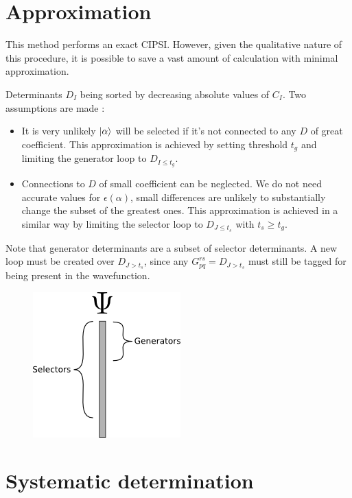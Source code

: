 \documentclass[./thesis.tex]{subfiles}
\begin{document}
\section{Approximation}

This method performs an exact CIPSI. However, given the qualitative nature of this procedure, it is possible to save a vast amount of calculation with minimal approximation.

Determinants $D_I$ being sorted by decreasing absolute values of $C_I$. Two assumptions are made :
\begin{itemize}
\item
It is very unlikely $\ket \alpha$ will be selected if it's not connected to any $D$ of great coefficient. This approximation is achieved by setting threshold $t_g$ and limiting the generator loop to $D_{I \leq t_g}$.
\item
Connections to $D$ of small coefficient can be neglected. We do not need accurate values for $\epsilon(\alpha)$, small differences are unlikely to substantially change the subset of the greatest ones. This approximation is achieved in a similar way by limiting the selector loop to $D_{J \leq t_s}$ with $t_s \geq t_g$.
\end{itemize}

Note that generator determinants are a subset of selector determinants.
A new loop must be created over $D_{J > t_s}$, since any $G_{pq}^{rs}=D_{J > t_s}$ must still be tagged for being present in the wavefunction.

\begin{figure}[h!]
	\begin{center}
		\includegraphics[width=0.4\columnwidth]{figures/cipsi/selexemple2}
		\caption{{\label{selexemple2}%
		}}
	\end{center}
\end{figure}






\section{Systematic determination}
\end{document}
